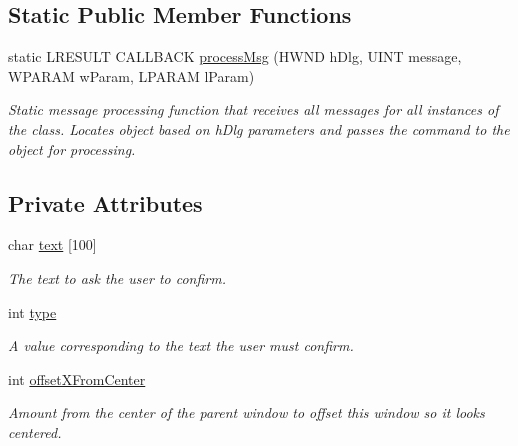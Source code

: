 \subsection*{Static Public Member Functions}
\begin{DoxyCompactItemize}
\item 
static LRESULT CALLBACK \hyperlink{class_confirm_dialog_a0c48617ba20204c68533b3b900ac77ce}{processMsg} (HWND hDlg, UINT message, WPARAM wParam, LPARAM lParam)
\begin{DoxyCompactList}\small\item\em Static message processing function that receives all messages for all instances of the class. Locates object based on hDlg parameters and passes the command to the object for processing. \end{DoxyCompactList}\end{DoxyCompactItemize}
\subsection*{Private Attributes}
\begin{DoxyCompactItemize}
\item 
\hypertarget{class_confirm_dialog_af4593c9e5e948df99f51dcf88d6e30fd}{
char \hyperlink{class_confirm_dialog_af4593c9e5e948df99f51dcf88d6e30fd}{text} \mbox{[}100\mbox{]}}
\label{class_confirm_dialog_af4593c9e5e948df99f51dcf88d6e30fd}

\begin{DoxyCompactList}\small\item\em The text to ask the user to confirm. \end{DoxyCompactList}\item 
\hypertarget{class_confirm_dialog_a676d0fb22c8b85ac88c0eddb3ce03666}{
int \hyperlink{class_confirm_dialog_a676d0fb22c8b85ac88c0eddb3ce03666}{type}}
\label{class_confirm_dialog_a676d0fb22c8b85ac88c0eddb3ce03666}

\begin{DoxyCompactList}\small\item\em A value corresponding to the text the user must confirm. \end{DoxyCompactList}\item 
\hypertarget{class_confirm_dialog_ae632daa425b7baef5101e05d8d8263f9}{
int \hyperlink{class_confirm_dialog_ae632daa425b7baef5101e05d8d8263f9}{offsetXFromCenter}}
\label{class_confirm_dialog_ae632daa425b7baef5101e05d8d8263f9}

\begin{DoxyCompactList}\small\item\em Amount from the center of the parent window to offset this window so it looks centered. \end{DoxyCompactList}\end{DoxyCompactItemize}


